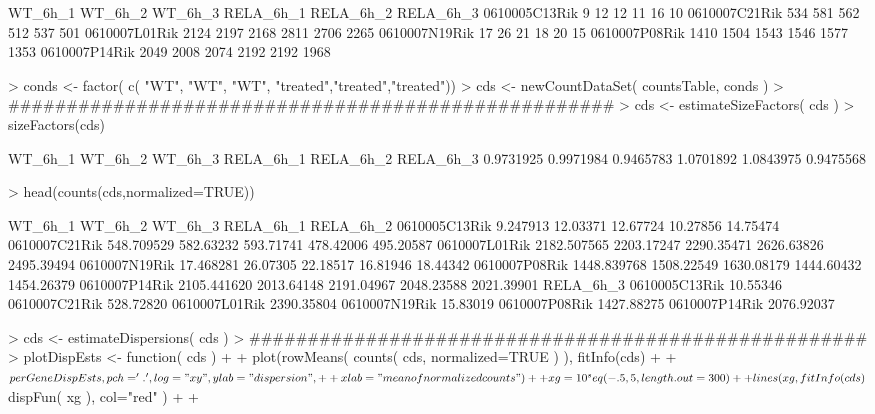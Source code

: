 \documentclass{article}
\begin{document}
\begin{Schunk}
\begin{Soutput}
              WT_6h_1 WT_6h_2 WT_6h_3 RELA_6h_1 RELA_6h_2 RELA_6h_3
0610005C13Rik       9      12      12        11        16        10
0610007C21Rik     534     581     562       512       537       501
0610007L01Rik    2124    2197    2168      2811      2706      2265
0610007N19Rik      17      26      21        18        20        15
0610007P08Rik    1410    1504    1543      1546      1577      1353
0610007P14Rik    2049    2008    2074      2192      2192      1968
\end{Soutput}
\begin{Sinput}
> conds <- factor( c( "WT", "WT", "WT", "treated","treated","treated"))
> cds <- newCountDataSet( countsTable, conds )
> ####################################################
> cds <- estimateSizeFactors( cds )
> sizeFactors(cds)
\end{Sinput}
\begin{Soutput}
  WT_6h_1   WT_6h_2   WT_6h_3 RELA_6h_1 RELA_6h_2 RELA_6h_3 
0.9731925 0.9971984 0.9465783 1.0701892 1.0843975 0.9475568 
\end{Soutput}
\begin{Sinput}
> head(counts(cds,normalized=TRUE))
\end{Sinput}
\begin{Soutput}
                  WT_6h_1    WT_6h_2    WT_6h_3  RELA_6h_1  RELA_6h_2
0610005C13Rik    9.247913   12.03371   12.67724   10.27856   14.75474
0610007C21Rik  548.709529  582.63232  593.71741  478.42006  495.20587
0610007L01Rik 2182.507565 2203.17247 2290.35471 2626.63826 2495.39494
0610007N19Rik   17.468281   26.07305   22.18517   16.81946   18.44342
0610007P08Rik 1448.839768 1508.22549 1630.08179 1444.60432 1454.26379
0610007P14Rik 2105.441620 2013.64148 2191.04967 2048.23588 2021.39901
               RELA_6h_3
0610005C13Rik   10.55346
0610007C21Rik  528.72820
0610007L01Rik 2390.35804
0610007N19Rik   15.83019
0610007P08Rik 1427.88275
0610007P14Rik 2076.92037
\end{Soutput}
\begin{Sinput}
> cds <- estimateDispersions( cds )
> #####################################################
> plotDispEsts <- function( cds ){
+   
+   plot(rowMeans( counts( cds, normalized=TRUE ) ), fitInfo(cds)
+        
+        $perGeneDispEsts, pch = '.', log="xy", ylab="dispersion",
+        
+        xlab="mean of normalized counts")
+   
+   xg = 10^seq( -.5, 5, length.out=300 )
+   
+   lines( xg, fitInfo(cds)$dispFun( xg ), col="red" )
+   
+ }
\end{Sinput}
\end{Schunk}
\end{document}
